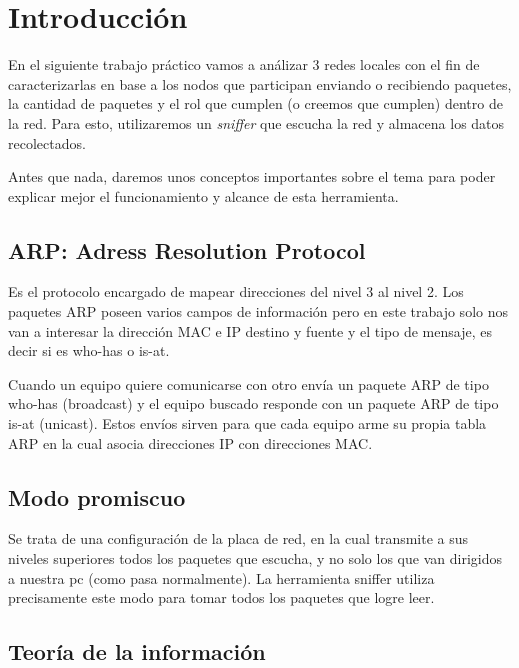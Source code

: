 \section{Introducción}

\par En el siguiente trabajo práctico vamos a análizar 3 redes locales con el fin de caracterizarlas en base a los nodos que participan enviando o recibiendo paquetes, la cantidad de paquetes y el rol que cumplen (o creemos que cumplen) dentro de la red. Para esto, utilizaremos un \textit{sniffer} que escucha la red y almacena los datos recolectados.
\par Antes que nada, daremos unos conceptos importantes sobre el tema para poder explicar mejor el funcionamiento y alcance de esta herramienta.

\subsection{ARP: Adress Resolution Protocol}

\par Es el protocolo encargado de mapear direcciones del nivel 3 al nivel 2. Los paquetes ARP poseen varios campos de información pero en este trabajo solo nos van a interesar la dirección MAC e IP destino y fuente y el tipo de mensaje, es decir si es who-has o is-at.
\par Cuando un equipo quiere comunicarse con otro envía un paquete ARP de tipo who-has (broadcast) y el equipo buscado responde con un paquete ARP de tipo is-at (unicast). Estos envíos sirven para que cada equipo arme su propia tabla ARP en la cual asocia direcciones IP con direcciones MAC.

\subsection{Modo promiscuo}

\par Se trata de una configuración de la placa de red, en la cual transmite a sus niveles superiores todos los paquetes que escucha, y no solo los que van dirigidos a nuestra pc (como pasa normalmente). La herramienta sniffer utiliza precisamente este modo para tomar todos los paquetes que logre leer.

\subsection{Teoría de la información}

